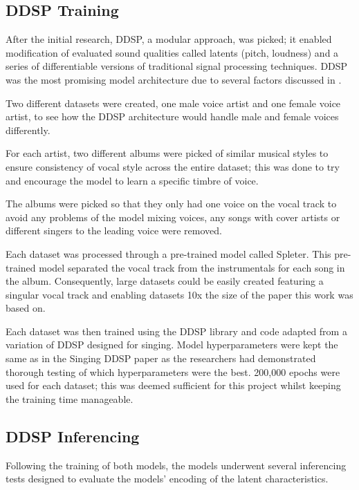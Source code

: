 \subsection{DDSP Training}

After the initial research, DDSP, a modular approach, was picked; it enabled modification of evaluated sound qualities called latents (pitch, loudness) and a series of differentiable versions of traditional signal processing techniques. DDSP was the most promising model architecture due to several factors discussed in .

Two different datasets were created, one male voice artist and one female voice artist, to see how the DDSP architecture would handle male and female voices differently.

For each artist, two different albums were picked of similar musical styles to ensure consistency of vocal style across the entire dataset; this was done to try and encourage the model to learn a specific timbre of voice.

The albums were picked so that they only had one voice on the vocal track to avoid any problems of the model mixing voices, any songs with cover artists or different singers to the leading voice were removed.

Each dataset was processed through a pre-trained model called Spleter\cite{Spleeter}. This pre-trained model separated the vocal track from the instrumentals for each song in the album. Consequently, large datasets could be easily created featuring a singular vocal track and enabling datasets 10x the size of the paper this work was based on\cite{SingingDDSP}.

Each dataset was then trained using the DDSP library\cite{DDSPPip} and code adapted from a variation of DDSP designed for singing\cite{SingingDDSP}. Model hyperparameters were kept the same as in the Singing DDSP paper\cite{SingingDDSP} as the researchers had demonstrated thorough testing of which hyperparameters were the best. 200,000 epochs were used for each dataset; this was deemed sufficient for this project whilst keeping the training time manageable.

\subsection{DDSP Inferencing}

Following the training of both models, the models underwent several inferencing tests designed to evaluate the models' encoding of the latent characteristics.

